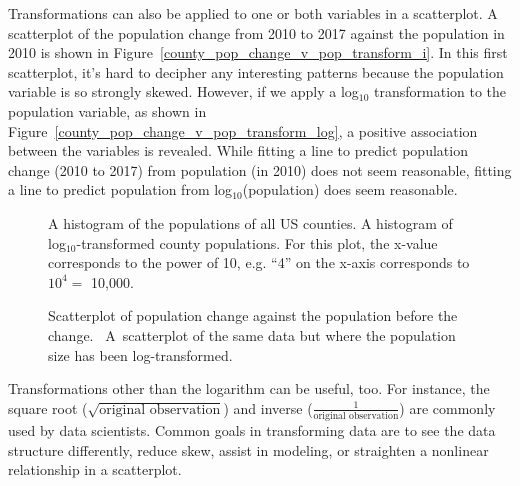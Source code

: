 Transformations can also be applied to one or both
variables in a scatterplot.
A scatterplot of the population change from 2010 to 2017
against the population in 2010 is shown in Figure~\ref{county_pop_change_v_pop_transform_i}.
In this first scatterplot, it's hard to decipher any
interesting patterns because the population variable
is so strongly skewed.
However, if we apply a log$_{10}$ transformation to
the population variable, as shown in
Figure~\ref{county_pop_change_v_pop_transform_log},
a positive association between the variables is revealed.
While fitting a line to predict population change (2010 to 2017) from population (in 2010) does not seem reasonable, fitting a line to predict population from log$_{10}$(population) does seem reasonable.  


\begin{figure}[ht]
    \label{county_pop_transformed}
  \centering
  \caption{ A histogram of
      the populations of all US counties.
       A histogram of
      log$_{10}$-transformed county populations.
      For this plot, the x-value corresponds to the power
      of 10, e.g. ``4'' on the x-axis corresponds to
      $10^4 =$ 10,000.}
\end{figure}

\begin{figure}
  \centering
  \caption{
      Scatterplot of population change
      against the population before the change.
      ~A~scatterplot
      of the same data but where the population
      size has been log-transformed.}
  \label{county_pop_change_v_pop_transform_main}
\end{figure}

Transformations other than the logarithm can be useful, too.
For instance, the square root
($\sqrt{\text{original observation}}$) and inverse
($\frac{1}{\text{original observation}}$) are commonly used
by data scientists.
Common goals in transforming data are to see the data
structure differently, reduce skew, assist in modeling,
or straighten a nonlinear relationship in a scatterplot.

